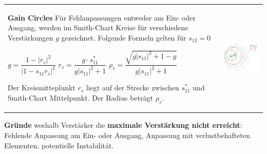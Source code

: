 \begin{tabular}{ll}
\parbox{9cm}{
    \textbf{Gain Circles} \\
    Für Fehlanpassungen entweder am Ein- oder Ausgang, werden im Smith-Chart Kreise für
    verschiedene Verstärkungen $g$ gezeichnet. Folgende Formeln gelten für $s_{12}=0$ \\

    $g= \dfrac{1-|r_s|^2}{|1-s_{11}r_s|^2}$ \\
    $r_s = \dfrac{g\cdot s_{11}^*}{g|s_{11}|^2+1}$ \\
    $\rho_s = \dfrac{\sqrt{g|s_{11}|^2+1-g}}{g|s_{11}|^2+1}$    \\
    
        Der Kreismitteplunkt $r_s$ liegt auf der Strecke zwischen $s_{11}^*$ und Smith-Chart
    Mittelpunkt. Der Radius beträgt $\rho_s$.  \\ 
     }
& \parbox{9cm}{        
        \includegraphics[width=7cm]{./bilder/components_amplifier_gain-circles.png}
        }\\
\end{tabular}


\textbf{Gründe} weshalb Verstärker die \textbf{maximale Verstärkung nicht erreicht}: \\
Fehlende Anpassung am Ein- oder Ausgang, Anpassung mit verlustbehafteten Elementen, potentielle
Instabilität.

